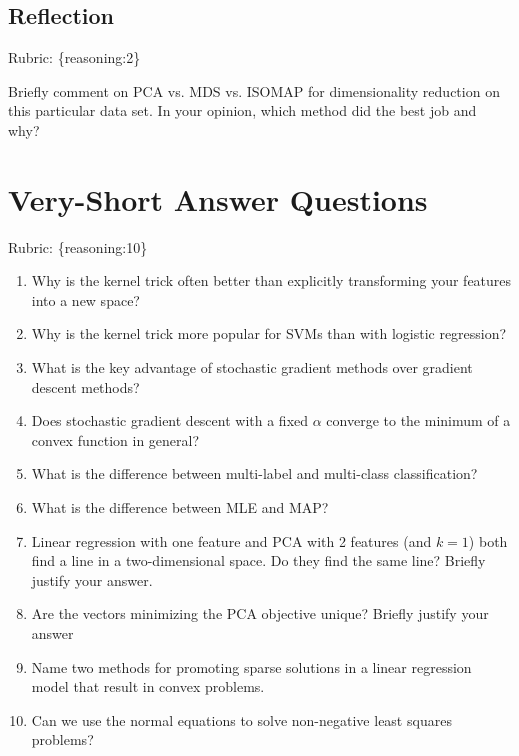 \documentclass{article}
\def\rubric#1{\gre{Rubric: \{#1\}}}{}
\def\blu#1{{\color{blu}#1}}
\def\gre#1{{\color{gre}#1}}
\def\enum#1{\begin{enumerate}#1\end{enumerate}}
\begin{document}
\subsection{Reflection}
\rubric{reasoning:2}

\blu{Briefly comment on PCA vs. MDS vs. ISOMAP for dimensionality reduction on this particular data set. In your opinion, which method did the best job and why?}


\section{Very-Short Answer Questions}
\rubric{reasoning:10}

\enum{
\item Why is the kernel trick often better than explicitly transforming your features into a new space?
\item Why is the kernel trick more popular for SVMs than with logistic regression?
\item What is the key advantage of stochastic gradient methods over gradient descent methods?
\item Does stochastic gradient descent with a fixed $\alpha$ converge to the minimum of a convex function in general?
\item What is the difference between multi-label and multi-class classification?
\item What is the difference between MLE and MAP?
\item Linear regression with one feature and PCA with 2 features (and $k=1$) both find a line in a two-dimensional space. Do they find the same line?
 Briefly justify your answer.
\item Are the vectors minimizing the PCA objective unique? Briefly justify your answer
\item Name two methods for promoting sparse solutions in a linear regression model that result in convex problems.
\item Can we use the normal equations to solve non-negative least squares problems?
}
\end{document}
